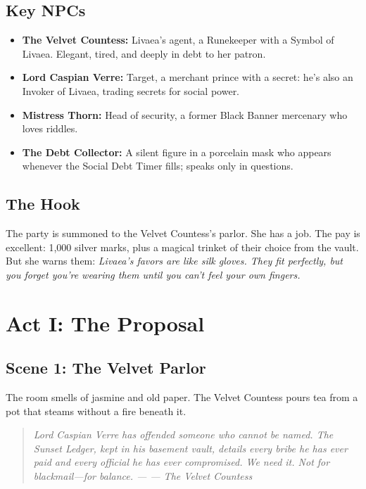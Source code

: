 \documentclass[12pt]{book}
\newcommand{\letter}[2]{%
    \begin{quote}\small\itshape #1 \hfill --- #2\end{quote}}
\begin{document}
\section{Key NPCs}

\begin{itemize}
    \item \textbf{The Velvet Countess:} Livaea's agent, a Runekeeper with a Symbol of Livaea. Elegant, tired, and deeply in debt to her patron.
    \item \textbf{Lord Caspian Verre:} Target, a merchant prince with a secret: he's also an Invoker of Livaea, trading secrets for social power.
    \item \textbf{Mistress Thorn:} Head of security, a former Black Banner mercenary who loves riddles.
    \item \textbf{The Debt Collector:} A silent figure in a porcelain mask who appears whenever the Social Debt Timer fills; speaks only in questions.
\end{itemize}

\section{The Hook}

The party is summoned to the Velvet Countess's parlor. She has a job. The pay is excellent: 1,000 silver marks, plus a magical trinket of their choice from the vault. But she warns them: \textit{Livaea's favors are like silk gloves. They fit perfectly, but you forget you're wearing them until you can't feel your own fingers.}

\chapter{Act I: The Proposal}

\section{Scene 1: The Velvet Parlor}

The room smells of jasmine and old paper. The Velvet Countess pours tea from a pot that steams without a fire beneath it.

\letter{Lord Caspian Verre has offended someone who cannot be named. The Sunset Ledger, kept in his basement vault, details every bribe he has ever paid and every official he has ever compromised. We need it. Not for blackmail---for balance.}{--- The Velvet Countess}
\end{document}
